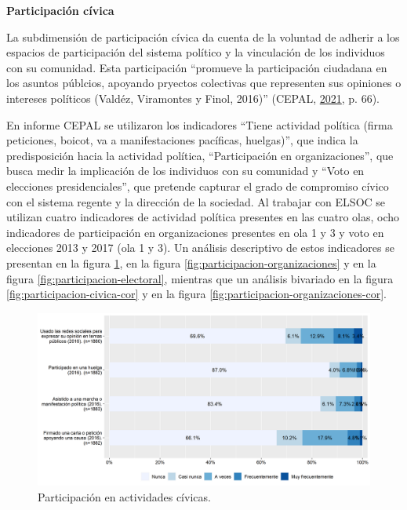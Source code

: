\documentclass[
  12pt,
]{book}
\begin{document}
\textbf{Participación cívica}

La subdimensión de participación cívica da cuenta de la voluntad de adherir a los espacios de participación del sistema político y la vinculación de los individuos con su comunidad. Esta participación ``promueve la participación ciudadana en los asuntos públcios, apoyando pryectos colectivas que representen sus opiniones o intereses políticos (Valdéz, Viramontes y Finol, 2016)'' (CEPAL, \protect\hyperlink{ref-cepal_Cohesion_2021}{2021}, p. 66).

En informe CEPAL se utilizaron los indicadores ``Tiene actividad política (firma peticiones, boicot, va a manifestaciones pacíficas, huelgas)'', que indica la predisposición hacia la actividad política, ``Participación en organizaciones'', que busca medir la implicación de los individuos con su comunidad y ``Voto en elecciones presidenciales'', que pretende capturar el grado de compromiso cívico con el sistema regente y la dirección de la sociedad. Al trabajar con ELSOC se utilizan cuatro indicadores de actividad política presentes en las cuatro olas, ocho indicadores de participación en organizaciones presentes en ola 1 y 3 y voto en elecciones 2013 y 2017 (ola 1 y 3). Un análisis descriptivo de estos indicadores se presentan en la figura \ref{fig:participacion-civica}, en la figura \ref{fig:participacion-organizaciones} y en la figura \ref{fig:participacion-electoral}, mientras que un análisis bivariado en la figura \ref{fig:participacion-civica-cor} y en la figura \ref{fig:participacion-organizaciones-cor}.

\begin{figure}[H]

{\centering \includegraphics[width=1\linewidth,height=1\textheight]{output/graphs/participacion-civica} 

}

\caption{Participación en actividades cívicas.}\label{fig:participacion-civica}
\end{figure}
\end{document}
